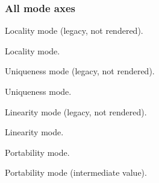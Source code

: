 \subsubsection{All mode axes\label{Oxcaml--all-mode-axes}}%
\label{Oxcaml--val-mode_global}\begin{ocamlindent}Locality mode (legacy, not rendered).\end{ocamlindent}%
\medbreak
\label{Oxcaml--val-mode_local}\begin{ocamlindent}Locality mode.\end{ocamlindent}%
\medbreak
\label{Oxcaml--val-mode_aliased}\begin{ocamlindent}Uniqueness mode (legacy, not rendered).\end{ocamlindent}%
\medbreak
\label{Oxcaml--val-mode_unique}\begin{ocamlindent}Uniqueness mode.\end{ocamlindent}%
\medbreak
\label{Oxcaml--val-mode_many}\begin{ocamlindent}Linearity mode (legacy, not rendered).\end{ocamlindent}%
\medbreak
\label{Oxcaml--val-mode_once}\begin{ocamlindent}Linearity mode.\end{ocamlindent}%
\medbreak
\label{Oxcaml--val-mode_portable}\begin{ocamlindent}Portability mode.\end{ocamlindent}%
\medbreak
\label{Oxcaml--val-mode_shareable}\begin{ocamlindent}Portability mode (intermediate value).\end{ocamlindent}%
